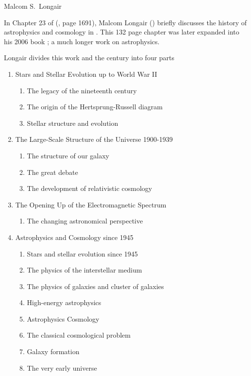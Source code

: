 
Malcom S.\ Longair

In Chapter 23 of  (\cite{Physics1995},
page 1691), Malcom Longair (\cite{Longair1995}) briefly discusses the
history of astrophysics and cosmology in .  This 132 page
chapter was later expanded into his 2006 book ;
a much longer work on  astrophysics.

Longair divides this work and the century into four parts

\begin{enumerate}
\item Stars and Stellar Evolution up to World War II
  \begin{enumerate}
  \item The legacy of the nineteenth century
  \item The origin of the Hertsprung-Russell diagram
  \item Stellar structure and evolution
  \end{enumerate}

\item The Large-Scale Structure of the Universe 1900-1939
  \begin{enumerate}
  \item The structure of our galaxy
  \item The great debate
  \item The development of relativistic cosmology
  \end{enumerate}

\item The Opening Up of the Electromagnetic Spectrum
  \begin{enumerate}
  \item The changing astronomical perspective
  \end{enumerate}

\item Astrophysics and Cosmology since 1945
  \begin{enumerate}
  \item Stars and stellar evolution since 1945
  \item The physics of the interstellar medium
  \item The physics of galaxies and cluster of galaxies
  \item High-energy astrophysics
  \item Astrophysics Cosmology
  \item The classical cosmological problem
  \item Galaxy formation
  \item The very early universe
  \end{enumerate}
\end{enumerate}


